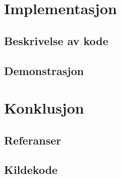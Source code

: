 \documentclass{article}
\begin{document}
	\newpage
	\section{Implementasjon}
		\subsection{Beskrivelse av kode}
			
		\subsection{Demonstrasjon}

	\newpage
	\section{Konklusjon}
		\subsection{Referanser}
		\subsection{Kildekode}
\end{document}
